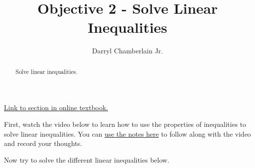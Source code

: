 \documentclass{ximera}
\author{Darryl Chamberlain Jr.}
\title{Objective 2 - Solve Linear Inequalities}
\begin{document}
\begin{abstract}
Solve linear inequalities. 
\end{abstract}
\maketitle

\href{https://cnx.org/contents/mwjClAV_@8.1:uIjtHMfW@9/Linear-Inequalities-and-Absolute-Value-Inequalities}{Link to section in online textbook.}


First, watch the video below to learn how to use the properties of inequalities to solve linear inequalities. You can \href{}{use the notes here} to follow along with the video and record your thoughts.

\youtube{}

Now try to solve the different linear inequalities below. 
\end{document}
